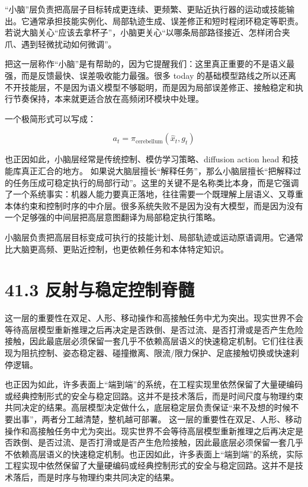 “小脑”层负责把高层子目标转成更连续、更频繁、更贴近执行器的运动或技能输出。它通常承担技能实例化、局部轨迹生成、误差修正和短时程闭环稳定等职责。若说大脑关心“应该去拿杯子”，小脑更关心“以哪条局部路径接近、怎样闭合夹爪、遇到轻微扰动如何微调”。

把这一层称作“小脑”是有帮助的，因为它提醒我们：这里真正重要的不是语义最强，而是反馈最快、误差吸收能力最强。很多 today 的基础模型路线之所以还离不开技能层，不是因为语义模型不够聪明，而是因为局部误差修正、接触稳定和执行节奏保持，本来就更适合放在高频闭环模块中处理。

一个极简形式可以写成：

\begin{equation*}
a_t = \pi_{\text{cerebellum}}(\hat{x}_t, g_t)
\end{equation*}

也正因如此，小脑层经常是传统控制、模仿学习策略、diffusion action head 和技能库真正汇合的地方。 如果说大脑层擅长“解释任务”，那么小脑层擅长“把解释过的任务压成可稳定执行的局部行动”。这里的关键不是名称类比本身，而是它强调了一个系统事实：机器人能力要真正落地，往往需要一个既理解上层语义、又尊重本体约束和控制时序的中介层。很多系统失败不是因为没有大模型，而是因为没有一个足够强的中间层把高层意图翻译为局部稳定执行策略。

小脑层负责把高层目标变成可执行的技能计划、局部轨迹或运动原语调用。它通常比大脑更高频、更贴近控制，也更依赖任务和本体特定知识。

\section*{41.3 反射与稳定控制脊髓}


这一层的重要性在双足、人形、移动操作和高接触任务中尤为突出。现实世界不会等待高层模型重新推理之后再决定是否跌倒、是否过流、是否打滑或是否产生危险接触，因此最底层必须保留一套几乎不依赖高层语义的快速稳定机制。它们往往表现为阻抗控制、姿态稳定器、碰撞撤离、限流/限力保护、足底接触切换或快速刹停逻辑。

也正因为如此，许多表面上“端到端”的系统，在工程实现里依然保留了大量硬编码或经典控制形式的安全与稳定回路。这并不是技术落后，而是时间尺度与物理约束共同决定的结果。高层模型决定做什么，底层稳定层负责保证“来不及想的时候不要出事”，两者分工越清楚，整机越可部署。 这一层的重要性在双足、人形、移动操作和高接触任务中尤为突出。现实世界不会等待高层模型重新推理之后再决定是否跌倒、是否过流、是否打滑或是否产生危险接触，因此最底层必须保留一套几乎不依赖高层语义的快速稳定机制。也正因如此，许多表面上“端到端”的系统，实际工程实现中依然保留了大量硬编码或经典控制形式的安全与稳定回路。这并不是技术落后，而是时序与物理约束共同决定的结果。

